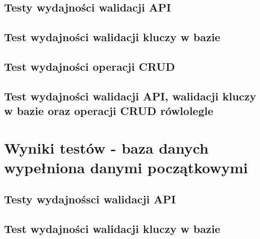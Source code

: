 \subsection{Testy wydajności walidacji API}


\clearpage

\subsection{Test wydajności walidacji kluczy w bazie}


\clearpage

\subsection{Test wydajności operacji CRUD}


\clearpage

\subsection{Test wydajności walidacji API, walidacji kluczy w bazie oraz operacji CRUD rówlolegle }


\clearpage

\newpage
\section{Wyniki testów - baza danych wypełniona danymi początkowymi}
\subsection{Testy wydajnośsci walidacji API}


\clearpage

\subsection{Test wydajności walidacji kluczy w bazie}


\clearpage


